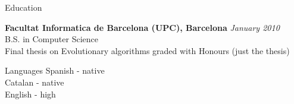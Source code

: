 \documentclass{resume} %
\begin{document}

\begin{rSection}{Education}

{\bf Facultat Informatica de Barcelona (UPC), Barcelona} \hfill {\em January 2010} \\
B.S. in Computer Science \\
Final thesis on Evolutionary algorithms graded with Honours (just the thesis) \smallskip \\
\end{rSection}

\begin{rSection}{Languages}
Spanish - native\\
Catalan - native\\
English - high\\
\end{rSection}
\end{document}
